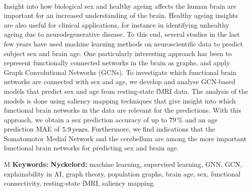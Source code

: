 \thesisImprintTitle\\
\thesisImprintSubtitle\\
\thesisAuthor\\
\thesisDepartment\\
\thesisUniversity\setlength{\parskip}{0.5cm}

\thispagestyle{plain}			%
\section*{\abstractname}

Insight into how biological sex and healthy ageing affects the human brain are important for an increased understanding of the brain. Healthy ageing insights are also useful for clinical applications, for instance in identifying unhealthy ageing due to neurodegenerative disease. To this end, several studies in the last few years have used machine learning methods on neuroscientific data to predict subject sex and brain age. One particularly interesting approach has been to represent functionally connected networks in the brain as graphs, and apply Graph Convolutional Networks (GCNs). To investigate which functional brain networks are connected with sex and age, we develop and analyse GCN-based models that predict sex and age from resting-state fMRI data. The analysis of the models is done using saliency mapping techniques that give insight into which functional brain networks in the data are relevant for the predictions. With this approach, we obtain a sex prediction accuracy of up to $79\,\%$ and an age prediction MAE of $5.9\rm\,years$. Furthermore, we find indications that the Somatomotor Medial Network and the cerebellum are among the more important functional brain networks for predicting sex and brain age.

\vfill
\if\thesisType M
    \textbf{Keywords:}
\else
    \textbf{Nyckelord:}
\fi
machine learning, supervised learning, GNN, GCN, explainability in AI, graph theory, population graphs, brain age, sex, functional connectivity, resting-state fMRI, saliency mapping.
\if{}
\newpage				%
\thispagestyle{empty}
\mbox{}
\fi
